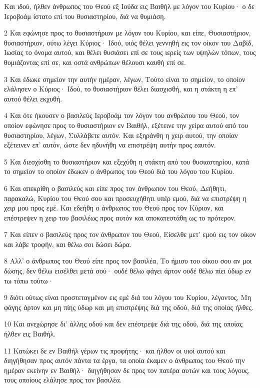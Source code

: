 \par Και ιδού, ήλθεν άνθρωπος του Θεού εξ Ιούδα εις Βαιθήλ με λόγον του Κυρίου· ο δε Ιεροβοάμ ίστατο επί του θυσιαστηρίου, διά να θυμιάση.
\par 2 Και εφώνησε προς το θυσιαστήριον με λόγον του Κυρίου, και είπε, Θυσιαστήριον, θυσιαστήριον, ούτω λέγει Κύριος· Ιδού, υιός θέλει γεννηθή εις τον οίκον του Δαβίδ, Ιωσίας το όνομα αυτού, και θέλει θυσιάσει επί σε τους ιερείς των υψηλών τόπων, τους θυμιάζοντας επί σε, και οστά ανθρώπων θέλουσι καυθή επί σε.
\par 3 Και έδωκε σημείον την αυτήν ημέραν, λέγων, Τούτο είναι το σημείον, το οποίον ελάλησεν ο Κύριος· Ιδού, το θυσιαστήριον θέλει διασχισθή, και η στάκτη η επ' αυτού θέλει εκχυθή.
\par 4 Και ότε ήκουσεν ο βασιλεύς Ιεροβοάμ τον λόγον του ανθρώπου του Θεού, τον οποίον εφώνησε προς το θυσιαστήριον εν Βαιθήλ, εξέτεινε την χείρα αυτού από του θυσιαστηρίου, λέγων, Συλλάβετε αυτόν. Και εξηράνθη η χειρ αυτού, την οποίαν εξέτεινεν επ' αυτόν, ώστε δεν ηδυνήθη να επιστρέψη αυτήν προς εαυτόν.
\par 5 Και διεσχίσθη το θυσιαστήριον και εξεχύθη η στάκτη από του θυσιαστηρίου, κατά το σημείον το οποίον έδωκεν ο άνθρωπος του Θεού διά του λόγου του Κυρίου.
\par 6 Και απεκρίθη ο βασιλεύς και είπε προς τον άνθρωπον του Θεού, Δεήθητι, παρακαλώ, Κυρίου του Θεού σου και προσευχήθητι υπέρ εμού, διά να επιστρέψη η χειρ μου προς εμέ. Και εδεήθη ο άνθρωπος του Θεού προς τον Κύριον, και επέστρεψεν η χειρ του βασιλέως προς αυτόν και αποκατεστάθη ως το πρότερον.
\par 7 Και είπεν ο βασιλεύς προς τον άνθρωπον του Θεού, Είσελθε μετ' εμού εις τον οίκον και λάβε τροφήν, και θέλω σοι δώσει δώρα.
\par 8 Αλλ' ο άνθρωπος του Θεού είπε προς τον βασιλέα, Το ήμισυ του οίκου σου αν μοι δώσης, δεν θέλω εισέλθει μετά σού· ουδέ θέλω φάγει άρτον ουδέ θέλω πίει ύδωρ εν τω τόπω τούτω·
\par 9 διότι ούτως είναι προστεταγμένον εις εμέ διά του λόγου του Κυρίου, λέγοντος, Μη φάγης άρτον και μη πίης ύδωρ και μη επιστρέψης διά της οδού, διά της οποίας ήλθες.
\par 10 Και ανεχώρησε δι' άλλης οδού και δεν επέστρεψε διά της οδού, διά της οποίας ήλθεν εις Βαιθήλ.
\par 11 Κατώκει δε εν Βαιθήλ γέρων τις προφήτης· και ήλθον οι υιοί αυτού και διηγήθησαν προς αυτόν πάντα τα έργα, τα οποία έκαμεν ο άνθρωπος του Θεού την ημέραν εκείνην εν Βαιθήλ· διηγήθησαν δε προς τον πατέρα αυτών και τους λόγους, τους οποίους ελάλησε προς τον βασιλέα.
